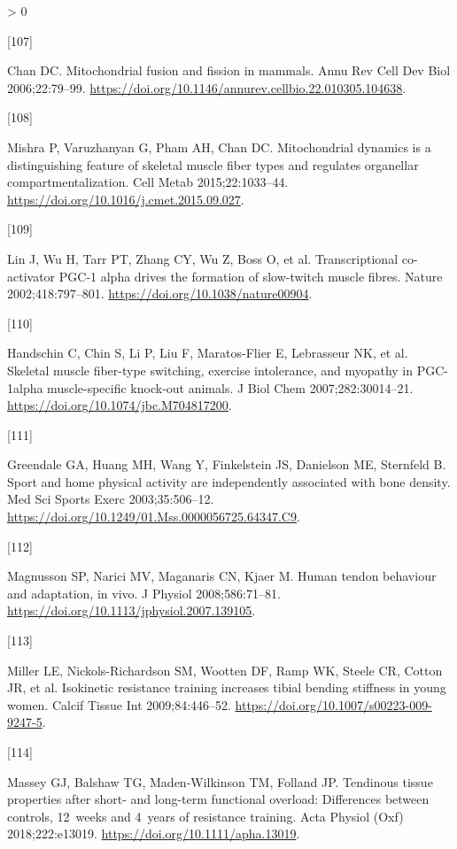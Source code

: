 \documentclass[twoside,10pt]{gihclass} %
\newlength{\cslhangindent}
\newlength{\csllabelwidth}
\newenvironment{CSLReferences}[3] %
 {%
  \setlength{\parindent}{0pt}
  \ifodd #1 \everypar{\setlength{\hangindent}{\cslhangindent}}\ignorespaces\fi
  \ifnum #2 > 0
  \setlength{\parskip}{#2\baselineskip}
  \fi
 }%
 {}
\newcommand{\CSLLeftMargin}[1]{\parbox[t]{\maxof{\widthof{#1}}{\csllabelwidth}}{#1}}
\newcommand{\CSLRightInline}[1]{\parbox[t]{\linewidth}{#1}}
\begin{document}
\begin{CSLReferences}{0}{0}
\leavevmode\hypertarget{ref-RN2817}{}%
\CSLLeftMargin{{[}107{]} }
\CSLRightInline{Chan DC. Mitochondrial fusion and fission in mammals. Annu Rev Cell Dev Biol 2006;22:79--99. \url{https://doi.org/10.1146/annurev.cellbio.22.010305.104638}.}

\leavevmode\hypertarget{ref-RN2816}{}%
\CSLLeftMargin{{[}108{]} }
\CSLRightInline{Mishra P, Varuzhanyan G, Pham AH, Chan DC. Mitochondrial dynamics is a distinguishing feature of skeletal muscle fiber types and regulates organellar compartmentalization. Cell Metab 2015;22:1033--44. \url{https://doi.org/10.1016/j.cmet.2015.09.027}.}

\leavevmode\hypertarget{ref-RN2818}{}%
\CSLLeftMargin{{[}109{]} }
\CSLRightInline{Lin J, Wu H, Tarr PT, Zhang CY, Wu Z, Boss O, et al. Transcriptional co-activator PGC-1 alpha drives the formation of slow-twitch muscle fibres. Nature 2002;418:797--801. \url{https://doi.org/10.1038/nature00904}.}

\leavevmode\hypertarget{ref-RN2819}{}%
\CSLLeftMargin{{[}110{]} }
\CSLRightInline{Handschin C, Chin S, Li P, Liu F, Maratos-Flier E, Lebrasseur NK, et al. Skeletal muscle fiber-type switching, exercise intolerance, and myopathy in PGC-1alpha muscle-specific knock-out animals. J Biol Chem 2007;282:30014--21. \url{https://doi.org/10.1074/jbc.M704817200}.}

\leavevmode\hypertarget{ref-RN2775}{}%
\CSLLeftMargin{{[}111{]} }
\CSLRightInline{Greendale GA, Huang MH, Wang Y, Finkelstein JS, Danielson ME, Sternfeld B. Sport and home physical activity are independently associated with bone density. Med Sci Sports Exerc 2003;35:506--12. \url{https://doi.org/10.1249/01.Mss.0000056725.64347.C9}.}

\leavevmode\hypertarget{ref-RN2771}{}%
\CSLLeftMargin{{[}112{]} }
\CSLRightInline{Magnusson SP, Narici MV, Maganaris CN, Kjaer M. Human tendon behaviour and adaptation, in vivo. J Physiol 2008;586:71--81. \url{https://doi.org/10.1113/jphysiol.2007.139105}.}

\leavevmode\hypertarget{ref-RN2774}{}%
\CSLLeftMargin{{[}113{]} }
\CSLRightInline{Miller LE, Nickols-Richardson SM, Wootten DF, Ramp WK, Steele CR, Cotton JR, et al. Isokinetic resistance training increases tibial bending stiffness in young women. Calcif Tissue Int 2009;84:446--52. \url{https://doi.org/10.1007/s00223-009-9247-5}.}

\leavevmode\hypertarget{ref-RN2772}{}%
\CSLLeftMargin{{[}114{]} }
\CSLRightInline{Massey GJ, Balshaw TG, Maden-Wilkinson TM, Folland JP. Tendinous tissue properties after short- and long-term functional overload: Differences between controls, 12~weeks and 4~years of resistance training. Acta Physiol (Oxf) 2018;222:e13019. \url{https://doi.org/10.1111/apha.13019}.}


\end{CSLReferences}
\end{document}
